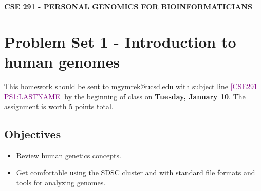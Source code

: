 \documentclass[12pt]{article}
\begin{document}
\textbf{CSE 291 - PERSONAL GENOMICS FOR BIOINFORMATICIANS}

\section*{Problem Set 1 - Introduction to human genomes}

This homework should be sent to mgymrek@ucsd.edu with subject line \textcolor{purple}{[CSE291 PS1:LASTNAME]} by the beginning of class on \textbf{Tuesday, January 10}. The assignment is worth 5 points total.

\subsection*{Objectives}
\begin{itemize}
\setlength\itemsep{0.0em}
\item Review human genetics concepts.
\item Get comfortable using the SDSC cluster and with standard file formats and tools for analyzing genomes.
\end{itemize}
\end{document}
